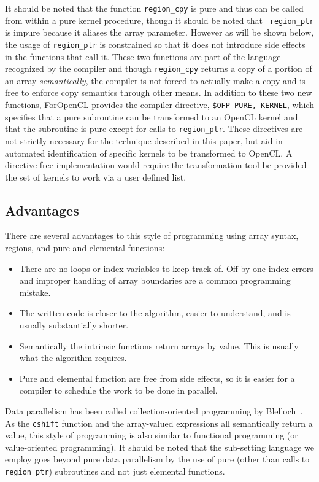 It should be noted that the function {\tt region\_cpy} is pure and thus can be
called from within a pure kernel procedure, though it should be noted that {\tt
region\_ptr} is impure because it aliases the array parameter.  However as will
be shown below, the usage of {\tt region\_ptr} is constrained so that it does not
introduce side effects in the functions that call it.  These two functions are
part of the language recognized by the compiler and though {\tt region\_cpy}
returns a copy of a portion of an array \emph{semantically}, the compiler is not
forced to actually make a copy and is free to enforce copy semantics through
other means.  In addition to these two new functions, ForOpenCL provides the
compiler directive, {\tt \!\$OFP PURE, KERNEL}, which specifies that a pure subroutine
can be transformed to an OpenCL kernel and that the subroutine is pure
except for calls to {\tt region\_ptr}.  These directives are not strictly
necessary for the technique described in this paper, but aid in automated
identification of specific kernels to be transformed to OpenCL.  A directive-free
implementation would require the transformation tool be provided the set of 
kernels to work via a user defined list.

\subsection{Advantages}

There are several advantages to this style of programming using array
syntax, regions, and pure and elemental functions:

\begin{itemize}
\item There are no loops or index variables to keep track of.  Off by
  one index errors and improper handling of array boundaries are a
  common programming mistake.
\item The written code is closer to the algorithm, easier to
  understand, and is usually substantially shorter.
\item Semantically the intrinsic functions return arrays by value.
  This is usually what the algorithm requires.
\item Pure and elemental function are free from side effects, so it is
  easier for a compiler to schedule the work to be done in parallel.
\end{itemize}

Data parallelism has been called collection-oriented programming by
Blelloch~\cite{blelloch90}.  As the {\tt cshift} function and the array-valued
expressions all semantically return a value, this style of programming is also
similar to functional programming (or value-oriented programming).  It should be
noted that the sub-setting language we employ goes beyond pure data parallelism
by the use of pure (other than calls to {\tt region\_ptr}) subroutines and
not just elemental functions.

